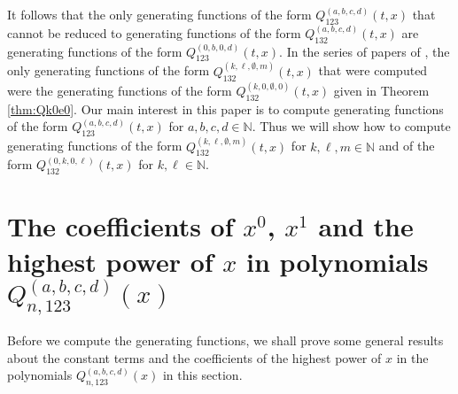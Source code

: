 \documentclass[
final,nomarks
]{dmtcs-episciences}
\newcommand{\Qmm}[1]{Q_{132}^{(#1)}(t,x)}
\newcommand{\Qm}[1]{Q_{123}^{(#1)}(t,x)}
\newcommand{\Qmn}[2]{Q_{#2,123}^{(#1)}(x)}
\begin{document}
It follows that the only generating 
functions of the form \begin{math}\Qm{a,b,c,d}\end{math} that cannot be reduced to generating functions 
of the form \begin{math}\Qmm{a,b,c,d}\end{math} are generating functions of the form 
\begin{math}\Qm{0,b,0,d}\end{math}. In the series of papers of \cite{KRT1,KRT2,KRT3}, the only generating 
functions of the form \begin{math}\Qmm{k,\ell,\emptyset,m}\end{math} that were computed were the generating 
functions of the form \begin{math}\Qmm{k,0,\emptyset,0}\end{math} given in Theorem \ref{thm:Qk0e0}. 
Our main interest in this paper is to compute generating functions of 
the form \begin{math}\Qm{a,b,c,d}\end{math} for \begin{math}a,b,c,d \in \mathbb{N}\end{math}. 
Thus we will show how to compute generating functions of the form 
\begin{math}\Qmm{k,\ell,\emptyset,m}\end{math} for \begin{math}k,\ell, m \in \mathbb{N}\end{math} and of the form 
\begin{math}\Qmm{0,k,0,\ell}\end{math} for \begin{math}k,\ell \in \mathbb{N}\end{math}. 

\section{The coefficients of \(x^0\), \(x^1\) and the highest power of \(x\) in polynomials \(\Qmn{a,b,c,d}{n}\)}

Before we compute the generating functions, we shall 
prove some general results about the constant terms and the coefficients 
of the highest power of \begin{math}x\end{math} in the polynomials 
\begin{math}\Qmn{a,b,c,d}{n}\end{math} in this section.
\end{document}
